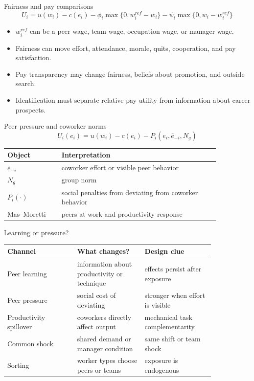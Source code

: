 \documentclass[aspectratio=169,11pt]{beamer}
\begin{document}
\begin{frame}{Fairness and pay comparisons}
\[
U_i = u\!\left(w_i\right) - c(e_i)
 - \phi_i \max\{0, w^{ref}_i - w_i\}
 - \psi_i \max\{0, w_i - w^{ref}_i\}
\]

\begin{itemize}
    \item $w^{ref}_i$ can be a peer wage, team wage, occupation wage, or manager wage.
    \item Fairness can move effort, attendance, morale, quits, cooperation, and pay satisfaction.
    \item Pay transparency may change fairness, beliefs about promotion, and outside search.
    \item Identification must separate relative-pay utility from information about career prospects.
\end{itemize}
\end{frame}

\begin{frame}{Peer pressure and coworker norms}
\[
U_i(e_i) = u\!\left(w_i\right) - c(e_i)
  - P_i\!\left(e_i,\bar e_{-i},N_g\right)
\]

\small
\begin{tabular}{p{0.22\linewidth} p{0.64\linewidth}}
\toprule
Object & Interpretation \\
\midrule
$\bar e_{-i}$ & coworker effort or visible peer behavior \\
$N_g$ & group norm \\
$P_i(\cdot)$ & social penalties from deviating from coworker behavior \\
Mas--Moretti & peers at work and productivity response \\
\bottomrule
\end{tabular}
\end{frame}

\begin{frame}{Learning or pressure?}
\small
\begin{tabular}{p{0.28\linewidth} p{0.27\linewidth} p{0.29\linewidth}}
\toprule
Channel & What changes? & Design clue \\
\midrule
Peer learning & information about productivity or technique & effects persist after exposure \\
Peer pressure & social cost of deviating & stronger when effort is visible \\
Productivity spillover & coworkers directly affect output & mechanical task complementarity \\
Common shock & shared demand or manager condition & same shift or team shock \\
Sorting & worker types choose peers or teams & exposure is endogenous \\
\bottomrule
\end{tabular}
\end{frame}
\end{document}

